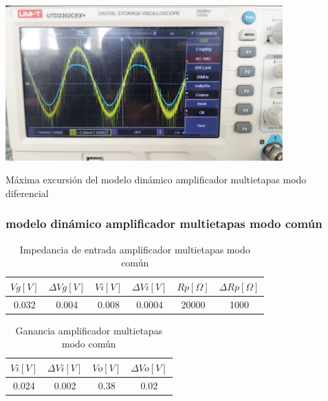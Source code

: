 \begin{ilustracion}[ht]
    \centering
    \includegraphics[width=0.8\textwidth]{src/images/resultados/p3/max-excursion-multietapas-mod-diff.png}
    \caption{Máxima excursión del modelo dinámico amplificador multietapas modo diferencial}
    \label{ilus:med-max-excursion-multietapas-mod-diff}
\end{ilustracion}

\FloatBarrier
\subsubsection{modelo dinámico amplificador multietapas modo común}

\begin{table}[h!]
\centering
\begin{tabular}{|c|c|c|c|c|c|}
\hline
\textbf{\(Vg[V]\)} & \textbf{\(\varDelta Vg[V]\)} & \textbf{\(Vi[V]\)} & \textbf{\(\varDelta Vi[V]\)} & \textbf{\(Rp[\Omega]\)} & \textbf{\(\varDelta Rp[\Omega]\)} \\ \hline
0.032 & 0.004 & 0.008 & 0.0004 & 20000 & 1000 \\ \hline
\end{tabular}
\caption{Impedancia de entrada amplificador multietapas modo común}
\label{tab:med-impedancia-entrada-amplificador-multietapas-modo-comun}
\end{table}


\begin{table}[h!]
\centering
\begin{tabular}{|c|c|c|c|}
\hline
\textbf{\(Vi[V]\)} & \textbf{\(\varDelta Vi[V]\)} & \textbf{\(Vo[V]\)} & \textbf{\(\varDelta Vo[V]\)} \\ \hline
0.024 & 0.002 & 0.38 & 0.02 \\ \hline
\end{tabular}
\caption{Ganancia amplificador multietapas modo común}
\label{tab:med-ganancia-amplificador-multietapas-modo-comun}
\end{table}

